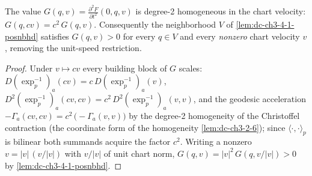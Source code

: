 \begin{lemma}
  \label{lem:dc-ch3-4-1-homog}
  \leanok
  The value $G(q,v)=\frac{\partial^2 F}{\partial t^2}(0,q,v)$ is degree-2 homogeneous in
  the chart velocity: $G(q,cv)=c^2\,G(q,v)$. Consequently the neighborhood $V$ of
  \cref{lem:dc-ch3-4-1-posnbhd} satisfies $G(q,v)>0$ for every $q\in V$ and every
  \emph{nonzero} chart velocity $v$, removing the unit-speed restriction.
\end{lemma}
\begin{proof}
  \leanok
  Under $v\mapsto cv$ every building block of $G$ scales:
  $D(\exp_p^{-1})_a(cv)=c\,D(\exp_p^{-1})_a(v)$,
  $D^2(\exp_p^{-1})_a(cv,cv)=c^2\,D^2(\exp_p^{-1})_a(v,v)$, and the geodesic acceleration
  $-\Gamma_a(cv,cv)=c^2\,\big(-\Gamma_a(v,v)\big)$ by the degree-2 homogeneity of the
  Christoffel contraction (the coordinate form of the homogeneity \cref{lem:dc-ch3-2-6});
  since $\langle\cdot,\cdot\rangle_p$ is bilinear both summands acquire the factor $c^2$.
  Writing a nonzero $v=|v|\,(v/|v|)$ with $v/|v|$ of unit chart norm,
  $G(q,v)=|v|^2\,G(q,v/|v|)>0$ by \cref{lem:dc-ch3-4-1-posnbhd}.
\end{proof}

